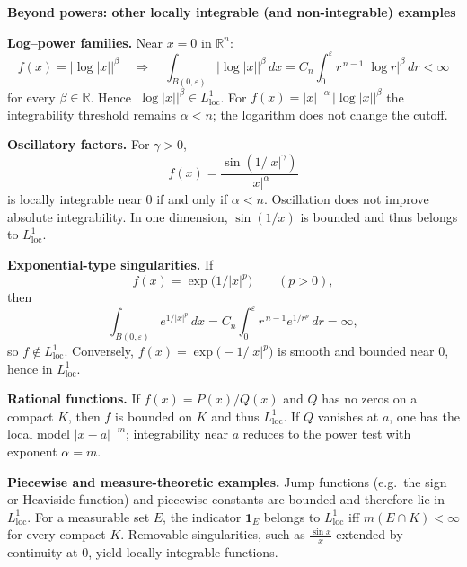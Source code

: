 \begin{problem}[CP-III-0024]
\par\medskip\noindent\textbf{Beyond powers: other locally integrable (and non-integrable) examples}\quad

\par\smallskip\noindent\textbf{Log--power families.}\quad
Near $x=0$ in $\mathbb R^n$:
\[
f(x)=|\log|x||^\beta \quad\Rightarrow\quad
\int_{B(0,\varepsilon)} |\log|x||^\beta\,dx
= C_n\!\int_0^\varepsilon r^{\,n-1}|\log r|^\beta\,dr<\infty
\]
for every $\beta\in\mathbb R$. Hence $|\log|x||^\beta\in L^1_{\mathrm{loc}}$.
For $f(x)=|x|^{-\alpha}\,|\log|x||^\beta$ the integrability threshold remains $\alpha<n$; the logarithm does not change the cutoff.

\bigskip

\par\smallskip\noindent\textbf{Oscillatory factors.}\quad
For $\gamma>0$,
\[
f(x)=\frac{\sin(1/|x|^\gamma)}{|x|^\alpha}
\]
is locally integrable near $0$ if and only if $\alpha<n$.
Oscillation does not improve absolute integrability. In one dimension, $\sin(1/x)$ is bounded and thus belongs to $L^1_{\mathrm{loc}}$.

\bigskip

\par\smallskip\noindent\textbf{Exponential-type singularities.}\quad
If
\[
f(x)=\exp\!\big(1/|x|^p\big)\qquad (p>0),
\]
then
\[
\int_{B(0,\varepsilon)} e^{1/|x|^p}\,dx
= C_n\!\int_0^\varepsilon r^{\,n-1} e^{1/r^p}\,dr=\infty,
\]
so $f\notin L^1_{\mathrm{loc}}$.
Conversely, $f(x)=\exp\!\big(-1/|x|^p\big)$ is smooth and bounded near $0$, hence in $L^1_{\mathrm{loc}}$.

\bigskip

\par\smallskip\noindent\textbf{Rational functions.}\quad
If $f(x)=P(x)/Q(x)$ and $Q$ has no zeros on a compact $K$, then $f$ is bounded on $K$ and thus $L^1_{\mathrm{loc}}$.
If $Q$ vanishes at $a$, one has the local model $|x-a|^{-m}$; integrability near $a$ reduces to the power test with exponent $\alpha=m$.

\bigskip

\par\smallskip\noindent\textbf{Piecewise and measure-theoretic examples.}\quad
Jump functions (e.g.\ the sign or Heaviside function) and piecewise constants are bounded and therefore lie in $L^1_{\mathrm{loc}}$.
For a measurable set $E$, the indicator $\mathbf 1_E$ belongs to $L^1_{\mathrm{loc}}$ iff $m(E\cap K)<\infty$ for every compact $K$.
Removable singularities, such as $\frac{\sin x}{x}$ extended by continuity at $0$, yield locally integrable functions.


\end{problem}
